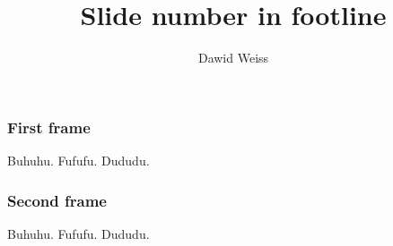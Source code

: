 \documentclass[12pt]{beamer}
\title{Slide number in footline}
\author{Dawid Weiss}
\begin{document}
\frame[plain]{\titlepage}

\begin{frame}
    \frametitle{First frame}
    Buhuhu. Fufufu. Dududu.
\end{frame}

\begin{frame}
    \frametitle{Second frame}
    Buhuhu. Fufufu. Dududu.
\end{frame}
\end{document}
